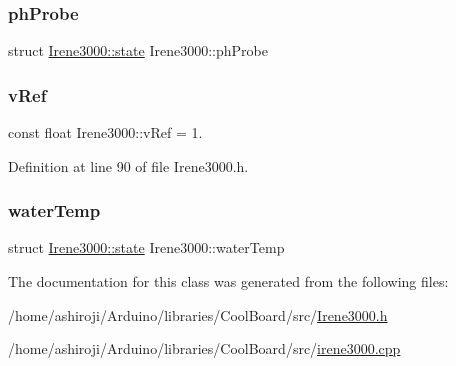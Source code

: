 \mbox{\label{class_irene3000_a997a4ee466fa1d5416e07e444965dc9e}} 
\subsubsection{\texorpdfstring{ph\+Probe}{phProbe}}
{\footnotesize\ttfamily struct \hyperlink{struct_irene3000_1_1state}{Irene3000\+::state}  Irene3000\+::ph\+Probe\hspace{0.3cm}{\ttfamily [private]}}

\mbox{\label{class_irene3000_a018e7ff9bee57e6d2b298667a668ba7e}} 
\subsubsection{\texorpdfstring{v\+Ref}{vRef}}
{\footnotesize\ttfamily const float Irene3000\+::v\+Ref = 1.\hspace{0.3cm}{\ttfamily [private]}}



Definition at line 90 of file Irene3000.\+h.

\mbox{\label{class_irene3000_af05612c78c758ce9db316c75ad937130}} 
\subsubsection{\texorpdfstring{water\+Temp}{waterTemp}}
{\footnotesize\ttfamily struct \hyperlink{struct_irene3000_1_1state}{Irene3000\+::state}  Irene3000\+::water\+Temp\hspace{0.3cm}{\ttfamily [private]}}



The documentation for this class was generated from the following files\+:\begin{DoxyCompactItemize}
\item 
/home/ashiroji/\+Arduino/libraries/\+Cool\+Board/src/\hyperlink{_irene3000_8h}{Irene3000.\+h}\item 
/home/ashiroji/\+Arduino/libraries/\+Cool\+Board/src/\hyperlink{irene3000_8cpp}{irene3000.\+cpp}\end{DoxyCompactItemize}
